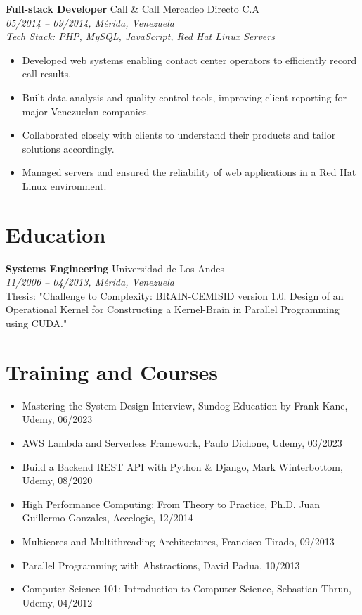 \documentclass[a4paper,10pt]{article}
\begin{document}
\textbf{Full-stack Developer} \hfill Call \& Call Mercadeo Directo C.A \\
\textit{05/2014 -- 09/2014, Mérida, Venezuela} \\
\textit{Tech Stack: PHP, MySQL, JavaScript, Red Hat Linux Servers} \\
\begin{itemize}[leftmargin=0.5cm]
    \item Developed web systems enabling contact center operators to efficiently record call results.
    \item Built data analysis and quality control tools, improving client reporting for major Venezuelan companies.
    \item Collaborated closely with clients to understand their products and tailor solutions accordingly.
    \item Managed servers and ensured the reliability of web applications in a Red Hat Linux environment.
\end{itemize}

\newpage

\section*{Education}

\textbf{Systems Engineering} \hfill Universidad de Los Andes \\
\textit{11/2006 -- 04/2013, Mérida, Venezuela} \\
Thesis: "Challenge to Complexity: BRAIN-CEMISID version 1.0. Design of an Operational Kernel for Constructing a Kernel-Brain in Parallel Programming using CUDA."

\section*{Training and Courses}
\begin{itemize}[leftmargin=0.5cm]
    \item Mastering the System Design Interview, Sundog Education by Frank Kane, Udemy, 06/2023
    \item AWS Lambda and Serverless Framework, Paulo Dichone, Udemy, 03/2023
    \item Build a Backend REST API with Python \& Django, Mark Winterbottom, Udemy, 08/2020
    \item High Performance Computing: From Theory to Practice, Ph.D. Juan Guillermo Gonzales, Accelogic, 12/2014
    \item Multicores and Multithreading Architectures, Francisco Tirado, 09/2013
    \item Parallel Programming with Abstractions, David Padua, 10/2013
    \item Computer Science 101: Introduction to Computer Science, Sebastian Thrun, Udemy, 04/2012
\end{itemize}
\end{document}
